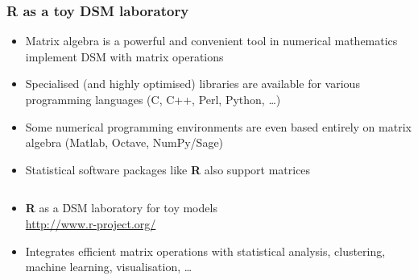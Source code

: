\begin{frame}
  \frametitle{R as a toy DSM laboratory}

  \begin{itemize}
  \item Matrix algebra is a powerful and convenient tool in numerical
    mathematics \so implement DSM with matrix operations
  \item Specialised (and highly optimised) libraries are available for various
    programming languages (C, C++, Perl, Python, \ldots)
  \item Some numerical programming environments are even based entirely on
    matrix algebra (Matlab, Octave, NumPy/Sage)
  \item Statistical software packages like \textbf{R} also support matrices
  \end{itemize}
  \pause
  \begin{columns}[c]
    \begin{column}{75mm}
      \begin{itemize}
      \item \textbf{R} as a \h{DSM laboratory} for toy models\\
        \url{http://www.r-project.org/}
      \item Integrates efficient matrix operations with statistical analysis,
        clustering, machine learning, visualisation, \ldots
      \end{itemize}
    \end{column}
    \begin{column}{20mm}
    \end{column}
  \end{columns}
\end{frame}

